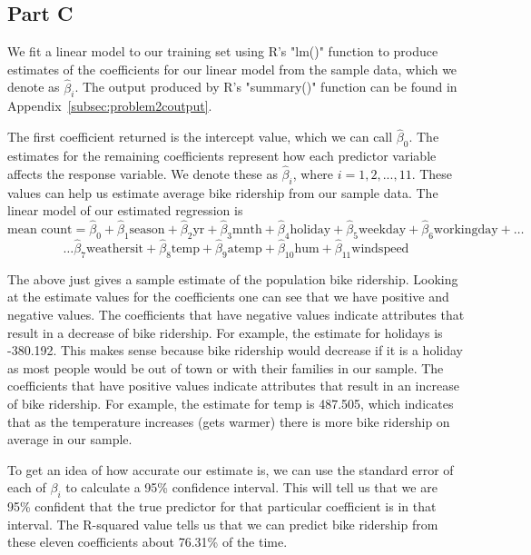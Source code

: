 \documentclass[11pt]{article}
\begin{document}
\subsection{Part C}
\label{subsec:2c}
We fit a linear model to our training set using R's "lm()" function to produce estimates of the coefficients for our linear model from the sample data, which we denote as $\hat{\beta}_{i}$. The output produced by R's "summary()" function can be found in Appendix~\ref{subsec:problem2coutput}.

The first coefficient returned is the intercept value, which we can call $\hat{\beta}_{0}$. The estimates for the remaining coefficients represent how each predictor variable affects the response variable. We denote these as $\hat{\beta}_{i}$, where $i=1,2,...,11$. These values can help us estimate average bike ridership from our sample data. The linear model of our estimated regression is
\begin{equation}
\text{mean count} = \hat{\beta}_0 + \hat{\beta}_1 \text{season} + \hat{\beta}_2 \text{yr} + \hat{\beta}_3\text{mnth} + \hat{\beta}_4\text{holiday} + \hat{\beta}_5\text{weekday} + \hat{\beta}_6\text{workingday} +  \dots
\end{equation}
\begin{equation}
\dots \hat{\beta}_7 \text{weathersit} + \hat{\beta}_8 \text{temp} + \hat{\beta}_9 \text{atemp} + \hat{\beta}_{10} \text{hum} + \hat{\beta}_{11} \text{windspeed}
\end{equation}

The above just gives a sample estimate of the population bike ridership. Looking at the estimate values for the coefficients one can see that we have positive and negative values. The coefficients that have negative values indicate attributes that result in a decrease of bike ridership. For example, the estimate for holidays is -380.192. This makes sense because bike ridership would decrease if it is a holiday as most people would be out of town or with their families in our sample. The coefficients that have positive values indicate attributes that result in an increase of bike ridership. For example, the estimate for temp is 487.505, which indicates that as the temperature increases (gets warmer) there is more bike ridership on average in our sample.  

To get an idea of how accurate our estimate is, we can use the standard error of each of $\beta_i$ to calculate a 95\% confidence interval. This will tell us that we are 95\% confident that the true predictor for that particular coefficient is in that interval. The R-squared value tells us that we can predict bike ridership from these eleven coefficients about 76.31\% of the time. 
\end{document}
